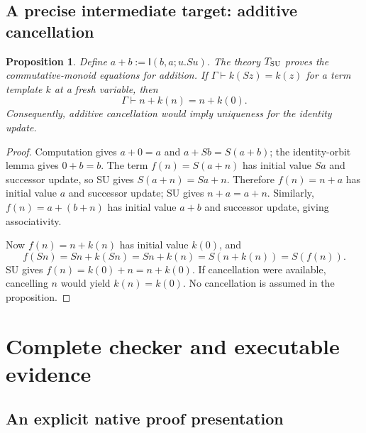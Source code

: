 \documentclass[11pt]{article}
\newtheorem{proposition}[theorem]{Proposition}
\theoremstyle{definition}
\newcommand{\Tsu}{T_{\rm SU}}
\newcommand{\I}{\mathsf I}
\newcommand{\G}{\Gamma}
\begin{document}
\subsection{A precise intermediate target: additive cancellation}

\begin{proposition}
Define $a+b:=\I(b,a;u.Su)$. The theory $\Tsu$ proves the commutative-monoid equations for addition. If $\G\vdash k(Sz)=k(z)$ for a term template $k$ at a fresh variable, then
\[
 \G\vdash n+k(n)=n+k(0).
\]
Consequently, additive cancellation would imply uniqueness for the identity update.
\end{proposition}
\begin{proof}
Computation gives $a+0=a$ and $a+Sb=S(a+b)$; the identity-orbit lemma gives $0+b=b$. The term $f(n)=S(a+n)$ has initial value $Sa$ and successor update, so SU gives $S(a+n)=Sa+n$. Therefore $f(n)=n+a$ has initial value $a$ and successor update; SU gives $n+a=a+n$. Similarly, $f(n)=a+(b+n)$ has initial value $a+b$ and successor update, giving associativity.

Now $f(n)=n+k(n)$ has initial value $k(0)$, and
\[
 f(Sn)=Sn+k(Sn)=Sn+k(n)=S(n+k(n))=S(f(n)).
\]
SU gives $f(n)=k(0)+n=n+k(0)$. If cancellation were available, cancelling $n$ would yield $k(n)=k(0)$. No cancellation is assumed in the proposition.
\end{proof}

\section{Complete checker and executable evidence}
\label{sec:implementation}

\subsection{An explicit native proof presentation}
\end{document}
